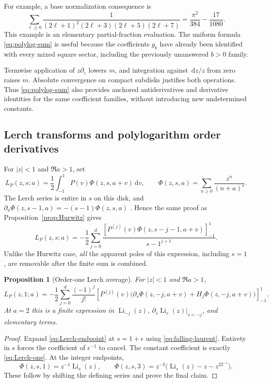 \documentclass[11pt]{article}
\numberwithin{equation}{section}
\newtheorem{proposition}[theorem]{Proposition}
\theoremstyle{definition}\newtheorem{definition}[theorem]{Definition}
\theoremstyle{remark}\newtheorem{remark}[theorem]{Remark}
\newcommand{\dd}{\,\mathrm d}
\newcommand{\Li}{\operatorname{Li}}
\newcommand{\fall}[2]{#1^{\underline{#2}}}
\newcommand{\eval}[1]{\left[#1\right]_{-1}^{1}}
\begin{document}
For example, a base normalization consequence is
\begin{equation}\label{eq:example-odd-sum}
 \sum_{\ell\ge0}
 \frac1{(2\ell+1)^2(2\ell+3)(2\ell+5)(2\ell+7)}
 =\frac{\pi^2}{384}-\frac{17}{1080}.
\end{equation}
This example is an elementary partial-fraction evaluation. The uniform
formula \eqref{eq:polylog-sum} is useful because the coefficients
$g_b$ have already been identified with every mixed square sector,
including the previously unanswered $b>0$ family.

Termwise application of $z\partial_z$ lowers $m$, and integration
against $\dd z/z$ from zero raises $m$. Absolute convergence on compact
subdisks justifies both operations. Thus \eqref{eq:polylog-sum} also
provides anchored antiderivatives and derivative identities for the same
coefficient families, without introducing new undetermined constants.

\subsection{Lerch transforms and polylogarithm order derivatives}
For $|z|<1$ and $\Re a>1$, set
\[
 L_P(z,s;a)=\frac12\int_{-1}^1P(v)\Phi(z,s,a+v)\dd v,
 \qquad
 \Phi(z,s,a)=\sum_{n\ge0}\frac{z^n}{(n+a)^s}.
\]
The Lerch series is entire in $s$ on this disk, and
$\partial_a\Phi(z,s-1,a)=-(s-1)\Phi(z,s,a)$
\cite{DLMF14}. Hence the same proof as Proposition~\ref{prop:Hurwitz}
gives
\begin{equation}\label{eq:Lerch-endpoint}
 L_P(z,s;a)=-\frac12\sum_{j=0}^d
 \frac{\eval{P^{(j)}(v)\Phi(z,s-j-1,a+v)}}{\fall{s-1}{j+1}}.
\end{equation}
Unlike the Hurwitz case, \emph{all} the apparent poles of this expression,
including $s=1$, are removable after the finite sum is combined.

\begin{proposition}[Order-one Lerch average]\label{prop:Lerch-one}
For $|z|<1$ and $\Re a>1$,
\begin{equation}\label{eq:Lerch-one}
 L_P(z,1;a)=-\frac12\sum_{j=0}^d\frac{(-1)^j}{j!}
 \eval{P^{(j)}(v)
 \bigl(\partial_s\Phi(z,-j,a+v)+H_j\Phi(z,-j,a+v)\bigr)}.
\end{equation}
At $a=2$ this is a finite expression in $\Li_{-j}(z)$,
$\partial_s\Li_s(z)|_{s=-j}$, and elementary terms.
\end{proposition}
\begin{proof}
Expand \eqref{eq:Lerch-endpoint} at $s=1+\epsilon$ using
\eqref{eq:falling-laurent}. Entirety in $s$ forces the coefficient of
$\epsilon^{-1}$ to cancel. The constant coefficient is exactly
\eqref{eq:Lerch-one}. At the integer endpoints,
\begin{equation}\label{eq:Lerch-integer}
 \Phi(z,s,1)=z^{-1}\Li_s(z),\qquad
 \Phi(z,s,3)=z^{-3}\bigl(\Li_s(z)-z-z^22^{-s}\bigr).
\end{equation}
These follow by shifting the defining series and prove the final claim.
\end{proof}
\end{document}
